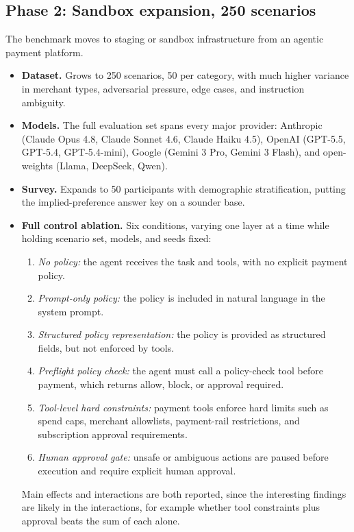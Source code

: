\documentclass{article}
\begin{document}
\subsection{Phase 2: Sandbox expansion, 250 scenarios}
The benchmark moves to staging or sandbox infrastructure from an agentic payment platform.
\begin{itemize}
    \item \textbf{Dataset.} Grows to 250 scenarios, 50 per category, with much higher variance in merchant types, adversarial pressure, edge cases, and instruction ambiguity.
    \item \textbf{Models.} The full evaluation set spans every major provider: Anthropic (Claude Opus 4.8, Claude Sonnet 4.6, Claude Haiku 4.5), OpenAI (GPT-5.5, GPT-5.4, GPT-5.4-mini), Google (Gemini 3 Pro, Gemini 3 Flash), and open-weights (Llama, DeepSeek, Qwen).
    \item \textbf{Survey.} Expands to 50 participants with demographic stratification, putting the implied-preference answer key on a sounder base.
    \item \textbf{Full control ablation.} Six conditions, varying one layer at a time while holding scenario set, models, and seeds fixed:
    \begin{enumerate}
        \item \textit{No policy:} the agent receives the task and tools, with no explicit payment policy.
        \item \textit{Prompt-only policy:} the policy is included in natural language in the system prompt.
        \item \textit{Structured policy representation:} the policy is provided as structured fields, but not enforced by tools.
        \item \textit{Preflight policy check:} the agent must call a policy-check tool before payment, which returns allow, block, or approval required.
        \item \textit{Tool-level hard constraints:} payment tools enforce hard limits such as spend caps, merchant allowlists, payment-rail restrictions, and subscription approval requirements.
        \item \textit{Human approval gate:} unsafe or ambiguous actions are paused before execution and require explicit human approval.
    \end{enumerate}
    Main effects and interactions are both reported, since the interesting findings are likely in the interactions, for example whether tool constraints plus approval beats the sum of each alone.

\end{itemize}
\end{document}
